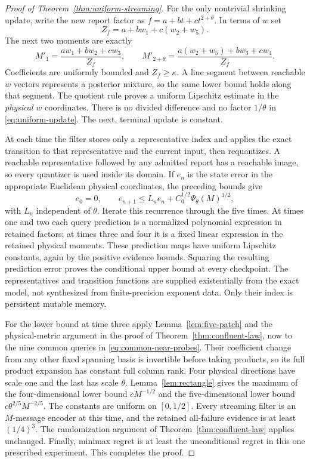 \begin{proof}[Proof of Theorem~\ref{thm:uniform-streaming}]
For the only nontrivial shrinking update, write the new report factor as
$f=a+bt+ct^{2+\theta}$. In terms of $w$ set
\[
 Z_f=a+bw_1+c(w_2+w_5).
\]
The next two moments are exactly
\begin{equation}\label{eq:uniform-update}
 M'_1=\frac{aw_1+bw_2+cw_3}{Z_f},\qquad
 M'_{2+\theta}=\frac{a(w_2+w_5)+bw_3+cw_4}{Z_f}.
\end{equation}
Coefficients are uniformly bounded and $Z_f\ge\kappa$. A line segment
between reachable $w$ vectors represents a posterior mixture, so the
same lower bound holds along that segment. The quotient rule proves a
uniform Lipschitz estimate in the \emph{physical} $w$ coordinates.
There is no divided difference and no factor $1/\theta$ in
\eqref{eq:uniform-update}. The next, terminal update is constant.

At each time the filter stores only a representative index and applies
the exact transition to that representative and the current input, then
requantizes. A reachable representative followed by any admitted report
has a reachable image, so every quantizer is used inside its domain.
If $e_n$ is the state error in the appropriate Euclidean physical
coordinates, the preceding bounds give
\[
 e_0=0,\qquad e_{n+1}\le L_ne_n+C_0^{1/2}\Psi_\theta(M)^{1/2},
\]
with $L_n$ independent of $\theta$. Iterate this recurrence through the
five times. At times one and two each query prediction is a normalized
polynomial expression in retained factors; at times three and four it
is a fixed linear expression in the retained physical moments. These
prediction maps have uniform Lipschitz constants, again by the positive
evidence bounds. Squaring the resulting prediction error proves the
conditional upper bound at every checkpoint. The representatives and
transition functions are supplied existentially from the exact model,
not synthesized from finite-precision exponent data. Only their index is
persistent mutable memory.

For the lower bound at time three apply
Lemma~\ref{lem:five-patch} and the physical-metric argument in the proof
of Theorem~\ref{thm:confluent-law}, now to the nine common queries in
\eqref{eq:common-near-probes}. Their coefficient change from any other
fixed spanning basis is invertible before taking products, so its full
product expansion has constant full column rank. Four physical directions
have scale one and the last has scale $\theta$. Lemma~\ref{lem:rectangle}
gives the maximum of the four-dimensional lower bound $cM^{-1/2}$ and
the five-dimensional lower bound $c\theta^{2/5}M^{-2/5}$. The constants
are uniform on $[0,1/2]$. Every streaming filter is an $M$-message encoder
at this time, and the retained all-failure evidence is at least $(1/4)^3$.
The randomization argument of Theorem~\ref{thm:confluent-law} applies
unchanged. Finally, minimax regret is at least the unconditional regret
in this one prescribed experiment. This completes the proof.
\end{proof}

